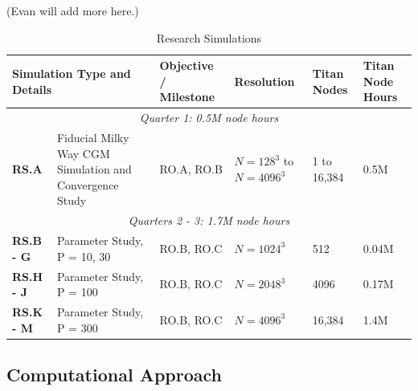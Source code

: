 \documentclass[11pt,letterpaper,english]{article}
\begin{document}
(Evan will add more here.)



\begin{table}[h]
\caption{Research Simulations}
\label{table:RS}
\begin{tabular}{|l|p{2in}|p{1in}|p{0.7in}|p{0.5in}|p{0.7in}|} 
\hline
\multicolumn{2}{|l|}{\bf Simulation Type and Details} & {\bf Objective / Milestone} & {\bf Resolution} & {\bf Titan Nodes} & {\bf Titan Node Hours} \\ \hline
\multicolumn{6}{|c|}{\it Quarter 1: 0.5M node hours} \\ \hline
\textbf{RS.A} & Fiducial Milky Way CGM Simulation and Convergence Study & RO.A, RO.B & $N = 128^3$ to $N=4096^3$ & 1 to 16,384 & 0.5M\\ \hline
\multicolumn{6}{|c|}{\it Quarters 2 - 3: 1.7M node hours} \\ \hline
\textbf{RS.B - G} & Parameter Study, P = 10, 30 & RO.B, RO.C & $N = 1024^3$ & 512 & 0.04M\\ \hline
\textbf{RS.H - J} & Parameter Study, P = 100 & RO.B, RO.C & $N=2048^3$ & 4096 & 0.17M\\ \hline
\textbf{RS.K - M} & Parameter Study, P = 300 & RO.B, RO.C & $N=4096^3$ & 16,384 & 1.4M\\ \hline
\end{tabular}
\end{table}


\vspace{-.25in}
\subsection{Computational Approach}
\vspace{-.2in}


\end{document}

